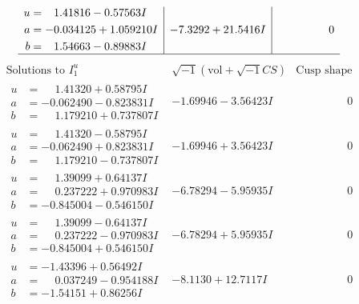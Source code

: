 \documentclass[1p]{elsarticle_modified}
\theoremstyle{definition}
\newcommand{\I}{\sqrt{-1}}
\begin{document}
$$\begin{array}{c|c|c}
\begin{aligned}
u &= \phantom{-}1.41816 - 0.57563 I \\
a &= -0.034125 + 1.059210 I \\
b &= \phantom{-}1.54663 - 0.89883 I\end{aligned}
 & -7.3292 + 21.5416 I & \phantom{-0.000000 } 0\\
 \hline 
 \end{array}$$\newpage$$\begin{array}{c|c|c}  
\text{Solutions to }I^u_{1}& \I (\text{vol} + \sqrt{-1}CS) & \text{Cusp shape}\\
 \hline 
\begin{aligned}
u &= \phantom{-}1.41320 + 0.58795 I \\
a &= -0.062490 - 0.823831 I \\
b &= \phantom{-}1.179210 + 0.737807 I\end{aligned}
 & -1.69946 - 3.56423 I & \phantom{-0.000000 } 0 \\ \hline\begin{aligned}
u &= \phantom{-}1.41320 - 0.58795 I \\
a &= -0.062490 + 0.823831 I \\
b &= \phantom{-}1.179210 - 0.737807 I\end{aligned}
 & -1.69946 + 3.56423 I & \phantom{-0.000000 } 0 \\ \hline\begin{aligned}
u &= \phantom{-}1.39099 + 0.64137 I \\
a &= \phantom{-}0.237222 + 0.970983 I \\
b &= -0.845004 - 0.546150 I\end{aligned}
 & -6.78294 - 5.95935 I & \phantom{-0.000000 } 0 \\ \hline\begin{aligned}
u &= \phantom{-}1.39099 - 0.64137 I \\
a &= \phantom{-}0.237222 - 0.970983 I \\
b &= -0.845004 + 0.546150 I\end{aligned}
 & -6.78294 + 5.95935 I & \phantom{-0.000000 } 0 \\ \hline\begin{aligned}
u &= -1.43396 + 0.56492 I \\
a &= \phantom{-}0.037249 - 0.954188 I \\
b &= -1.54151 + 0.86256 I\end{aligned}
 & -8.1130 + 12.7117 I & \phantom{-0.000000 } 0 \\ \hline\begin{aligned}

\end{aligned}
\end{array}$$
\end{document}
